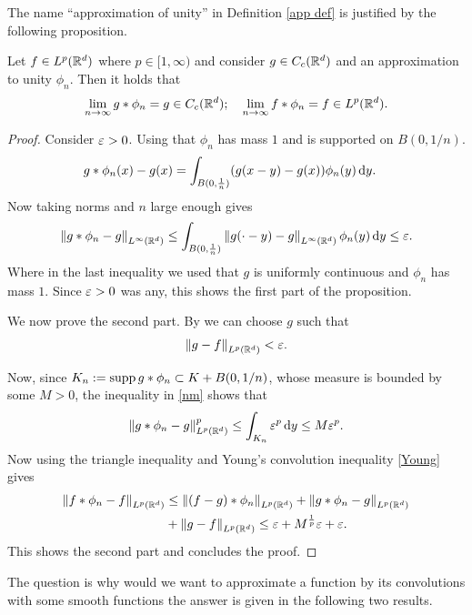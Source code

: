 \documentclass[
    a4paper,
    DIV=14,
    abstract=true,
    numbers=noenddot
]{scrartcl}
\begin{document}
The name ``approximation of unity'' in Definition \ref{app def} is justified by the following proposition.
\begin{proposition}\label{app pn}
	Let $f \in L^p(\mathbb{R}^d)$ where $p \in [1,\infty)$ and consider $g \in C_c(\mathbb{R}^d)$ and an approximation to unity $\phi_n$. Then it holds that
	\begin{align*}
		\lim_{n \to \infty}g*\phi_n=g \in  C_c(\mathbb{R}^d);\quad \lim_{n \to \infty}f*\phi_n=f \in  L^p(\mathbb{R}^d).
	\end{align*}
\end{proposition}
\begin{proof}
	Consider $\varepsilon >0$. Using that $\phi_n$ has mass $1$ and is supported on  $B(0,1/n)$.
	\begin{align*}
		g*\phi_n(x)-g(x) & = \int_{B(0, \frac{1}{n})}(g(x-y)-g(x)) \phi_n(y) \,\mathrm{d} y
		.
	\end{align*}
	Now taking norms and $n$ large enough gives
	\begin{align}\label{nm}
		\left\lVert g*\phi_n-g \right\rVert_{L^\infty(\mathbb{R}^d)} \leq \int_{B(0, \frac{1}{n})} \left\lVert g(\cdot -y) -g \right\rVert_{L^\infty(\mathbb{R}^d)} \phi_n(y) \,\mathrm{d} y\leq \varepsilon   .
	\end{align}
	Where in the last inequality we used that $g$ is uniformly continuous and $\phi_n$ has mass $1$. Since $\varepsilon >0$ was any, this shows the first part of the proposition.

	We now prove the second part. By  we can choose $g $ such that
	\begin{align*}
		\left\lVert g-f \right\rVert_{L^p(\mathbb{R}^d)}<\varepsilon .
	\end{align*}


	Now, since $K_n:=\operatorname{supp}{g* \phi_n} \subset K + B(0, 1 /n)$, whose measure is bounded by some $M>0$, the inequality in  \eqref{nm} shows that
	\begin{align*}
		\left\lVert g*\phi_n-g \right\rVert_{L^p(\mathbb{R}^d)}^p \leq \int_{K_n} \varepsilon^p   \,\mathrm{d} y\leq M\varepsilon^p  .
	\end{align*}
	Now using the triangle inequality and  Young's convolution inequality \ref{Young} gives
	\begin{align*}
		\left\lVert f*\phi_n-f \right\rVert_{L^p(\mathbb{R}^d)} & \leq\left\lVert (f-g)*\phi_n \right\rVert_{L^p(\mathbb{R}^d)}+\left\lVert g*\phi_n-g \right\rVert_{L^p(\mathbb{R}^d)}          \\
		                              & +\left\lVert g-f \right\rVert_{L^p(\mathbb{R}^d)}\leq \varepsilon + M^{\frac{1}{p}}\varepsilon +\varepsilon .
	\end{align*}
	This shows the second part and concludes the proof.
\end{proof}
The question is why would we want to approximate a function by its convolutions with some smooth functions the answer is given in the following two results.
\end{document}
